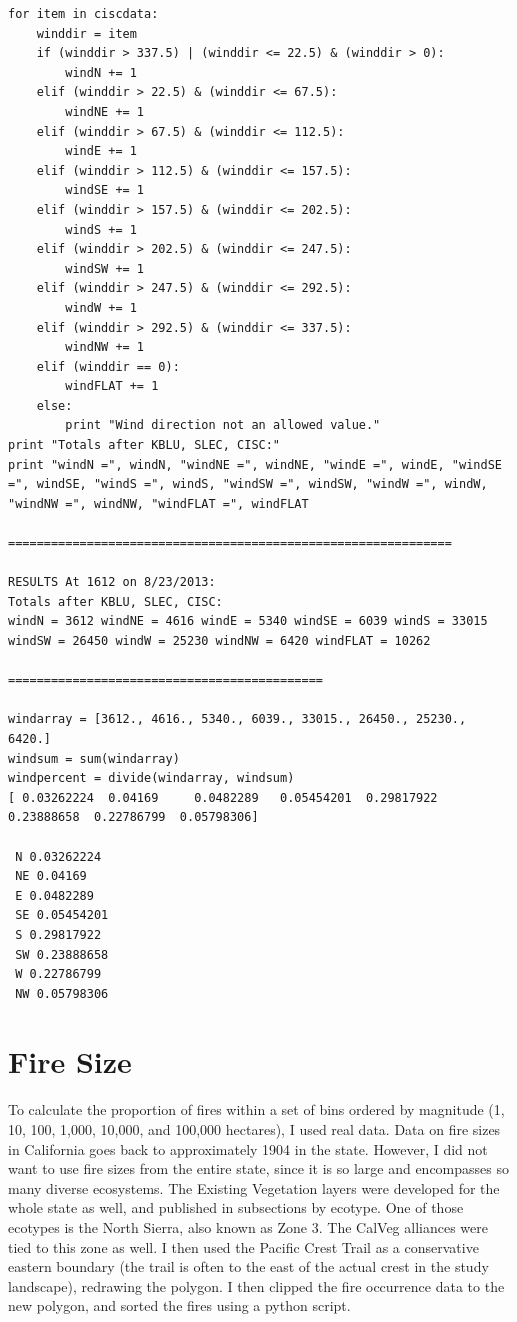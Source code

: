 \begin{lstlisting}
for item in ciscdata:
    winddir = item
    if (winddir > 337.5) | (winddir <= 22.5) & (winddir > 0):
        windN += 1
    elif (winddir > 22.5) & (winddir <= 67.5):
        windNE += 1
    elif (winddir > 67.5) & (winddir <= 112.5):
        windE += 1
    elif (winddir > 112.5) & (winddir <= 157.5):
        windSE += 1
    elif (winddir > 157.5) & (winddir <= 202.5):
        windS += 1
    elif (winddir > 202.5) & (winddir <= 247.5):
        windSW += 1
    elif (winddir > 247.5) & (winddir <= 292.5):
        windW += 1
    elif (winddir > 292.5) & (winddir <= 337.5):
        windNW += 1
    elif (winddir == 0):
        windFLAT += 1
    else:
        print "Wind direction not an allowed value."    
print "Totals after KBLU, SLEC, CISC:"
print "windN =", windN, "windNE =", windNE, "windE =", windE, "windSE =", windSE, "windS =", windS, "windSW =", windSW, "windW =", windW, "windNW =", windNW, "windFLAT =", windFLAT

==============================================================

RESULTS At 1612 on 8/23/2013:
Totals after KBLU, SLEC, CISC:
windN = 3612 windNE = 4616 windE = 5340 windSE = 6039 windS = 33015 windSW = 26450 windW = 25230 windNW = 6420 windFLAT = 10262

============================================

windarray = [3612., 4616., 5340., 6039., 33015., 26450., 25230., 6420.]
windsum = sum(windarray)
windpercent = divide(windarray, windsum)
[ 0.03262224  0.04169     0.0482289   0.05454201  0.29817922  0.23888658  0.22786799  0.05798306]

 N 0.03262224
 NE 0.04169
 E 0.0482289
 SE 0.05454201
 S 0.29817922
 SW 0.23888658
 W 0.22786799
 NW 0.05798306
\end{lstlisting}

\section{Fire Size}
To calculate the proportion of fires within a set of bins ordered by magnitude (1, 10, 100, 1,000, 10,000, and 100,000 hectares), I used real data. Data on fire sizes in California goes back to approximately 1904 in the state. However, I did not want to use fire sizes from the entire state, since it is so large and encompasses so many diverse ecosystems. The Existing Vegetation layers were developed for the whole state as well, and published in subsections by ecotype. One of those ecotypes is the North Sierra, also known as Zone 3. The CalVeg alliances were tied to this zone as well. I then used the Pacific Crest Trail as a conservative eastern boundary (the trail is often to the east of the actual crest in the study landscape), redrawing the polygon. I then clipped the fire occurrence data to the new polygon, and sorted the fires using a python script.

